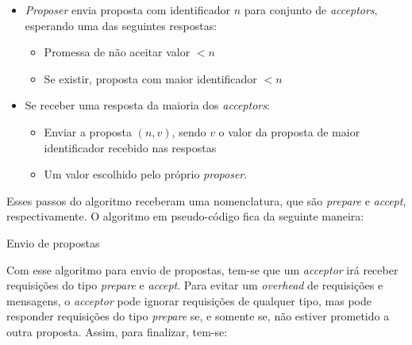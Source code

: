 \documentclass[
    12pt,
    openright, 
    oneside,
    a4paper,
    french,
    english,
    brazil
    ]{facom-ufu-abntex2}
\theoremstyle{definition}
\begin{document}
\begin{itemize}
    \item[]\emph{Proposer} envia proposta com identificador $n$ para conjunto de 
\emph{acceptors}, esperando uma das seguintes respostas:

    \begin{itemize}
        \item[] Promessa de não aceitar valor $<n$
        \item[] Se existir, proposta com maior identificador $<n$
    \end{itemize}
    
    \item[]Se receber uma resposta da maioria dos \emph{acceptors}:
    \begin{itemize}
        \item[] Enviar a proposta $(n, v)$, sendo $v$ o valor da proposta de maior identificador
        recebido nas respostas
        \item[] Um valor escolhido pelo próprio \emph{proposer}.
    \end{itemize}
\end{itemize}

Esses passos do algoritmo receberam uma nomenclatura, que são \emph{prepare} e
\emph{accept}, respectivamente. O algoritmo em pseudo-código fica da seguinte maneira:

\begin{algorithm}[H]
\caption{Envio de propostas}
\SetAlgoLined
{}
\end{algorithm}

Com esse algoritmo para envio de propostas, tem-se que um \emph{acceptor} irá
receber requisições do tipo \emph{prepare} e \emph{accept}. Para evitar um \emph{overhead}
de requisições e mensagens, o \emph{acceptor} pode ignorar requisições de qualquer tipo,
mas pode responder requisições do tipo \emph{prepare} se, e somente se, não estiver
prometido a outra proposta. Assim, para finalizar, tem-se:
\end{document}
